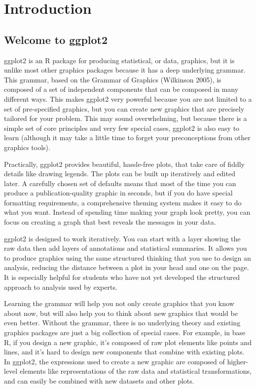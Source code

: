\chapter{Introduction}\label{cha:introduction}

\section{Welcome to ggplot2}

ggplot2 is an R package for producing statistical, or data, graphics,
but it is unlike most other graphics packages because it has a deep
underlying grammar. This grammar, based on the Grammar of Graphics
(Wilkinson 2005), is composed of a set of independent components that
can be composed in many different ways. This makes ggplot2 very powerful
because you are not limited to a set of pre-specified graphics, but you
can create new graphics that are precisely tailored for your problem.
This may sound overwhelming, but because there is a simple set of core
principles and very few special cases, ggplot2 is also easy to learn
(although it may take a little time to forget your preconceptions from
other graphics tools).

Practically, ggplot2 provides beautiful, hassle-free plots, that take
care of fiddly details like drawing legends. The plots can be built up
iteratively and edited later. A carefully chosen set of defaults means
that most of the time you can produce a publication-quality graphic in
seconds, but if you do have special formatting requirements, a
comprehensive theming system makes it easy to do what you want. Instead
of spending time making your graph look pretty, you can focus on
creating a graph that best reveals the messages in your data.

ggplot2 is designed to work iteratively. You can start with a layer
showing the raw data then add layers of annotations and statistical
summaries. It allows you to produce graphics using the same structured
thinking that you use to design an analysis, reducing the distance
between a plot in your head and one on the page. It is especially
helpful for students who have not yet developed the structured approach
to analysis used by experts.

Learning the grammar will help you not only create graphics that you
know about now, but will also help you to think about new graphics that
would be even better. Without the grammar, there is no underlying theory
and existing graphics packages are just a big collection of special
cases. For example, in base R, if you design a new graphic, it's
composed of raw plot elements like points and lines, and it's hard to
design new components that combine with existing plots. In ggplot2, the
expressions used to create a new graphic are composed of higher-level
elements like representations of the raw data and statistical
transformations, and can easily be combined with new datasets and other
plots.

